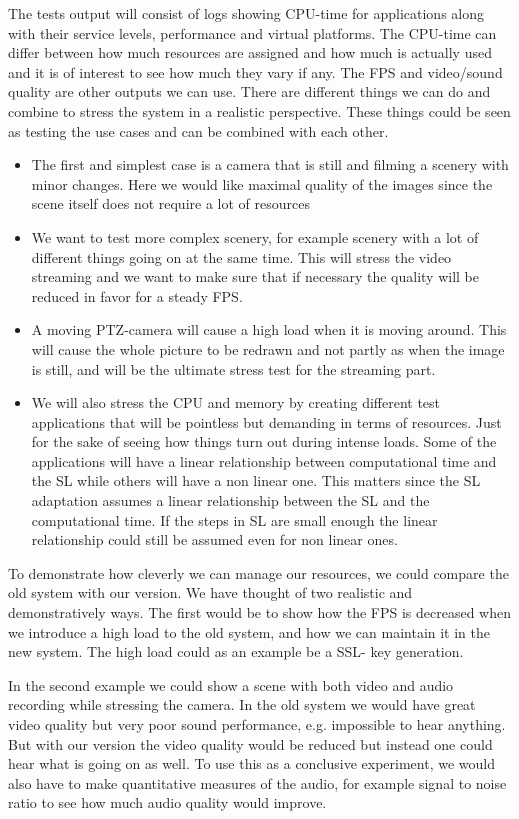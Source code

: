 \documentclass{LTHthesis}
\begin{document}
The tests output will consist of logs showing CPU-time for applications along with their service levels, performance and virtual platforms. The CPU-time can differ between how much resources are assigned and how much is actually used and it is of interest to see how much they vary if any. The FPS and video/sound quality are other outputs we can use.
There are different things we can do and combine to stress the system in a realistic perspective. These things could be seen as testing the use cases and can be combined with each other. 
\begin{itemize}

\item The first and simplest case is a camera that is still and filming a scenery with minor changes. Here we would like maximal quality of the images since the scene itself does not require a lot of resources 
\item We want to test more complex scenery, for example scenery with a lot of different things going on at the same time. This will stress the video streaming and we want to make sure that if necessary the quality will be reduced in favor for a steady FPS.
\item A moving PTZ-camera will cause a high load when it is moving around. This will cause the whole picture to be redrawn and not partly as when the image is still, and will be the ultimate stress test for the streaming part.
\item We will also stress the CPU and memory by creating different test applications that will be pointless but demanding in terms of resources. Just for the sake of seeing how things turn out during intense loads. Some of the applications will have a linear relationship between computational time and the SL while others will have a non linear one. This matters since the SL adaptation assumes a linear relationship between the SL and the computational time. If the steps in SL are small enough the linear relationship could still be assumed even for non linear ones.
\end{itemize}
To demonstrate how cleverly we can manage our resources, we could compare the old system with our version. We have thought of two realistic and demonstratively ways. The first would be to show how the FPS is decreased when we introduce a high load to the old system, and how we can maintain it in the new system. The high load could as an example be a SSL- key generation.

In the second example we could show a scene with both video and audio recording while stressing the camera. In the old system we would have great video quality but very poor sound performance, e.g. impossible to hear anything. But with our version the video quality would be reduced but instead one could hear what is going on as well. To use this as a conclusive experiment, we would also have to make quantitative measures of the audio, for example signal to noise ratio to see how much audio quality would improve.
\end{document}
